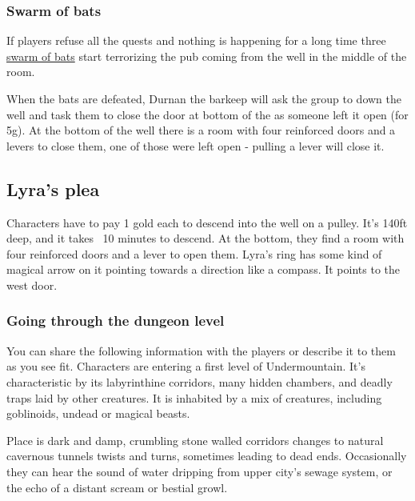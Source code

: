 \documentclass[10pt,onecolumn,twoside,openany,bg=full,layout=true]{dndbook}
\begin{document}
\subsubsection{Swarm of bats}
If players refuse all the quests and nothing is happening for a long time three
\href{https://www.dndbeyond.com/monsters/17028-swarm-of-bats}{swarm of bats} start terrorizing the pub coming from the well in the middle of the room.

When the bats are defeated, Durnan the barkeep will ask the group to down the well and task them to close the door at bottom of the as someone left it open (for 5g).
At the bottom of the well there is a room with four reinforced doors and a levers to close them, one of those were left open - pulling a lever will close it.
\vfill
\newpage

\subsection{Lyra's plea}\label{subsec:lyras-plea}
Characters have to pay 1 gold each to descend into the well on a pulley.
It's 140ft deep, and it takes ~10 minutes to descend.
At the bottom, they find a room with four reinforced doors and a lever to open them.
Lyra's ring has some kind of magical arrow on it pointing towards a direction like a compass.
It points to the west door.
\subsubsection{Going through the dungeon level}
You can share the following information with the players or describe it to them as you see fit.
Characters are entering a first level of Undermountain.
It's characteristic by its labyrinthine corridors, many hidden chambers, and deadly traps laid by other creatures.
It is inhabited by a mix of creatures, including goblinoids, undead or magical beasts.
\begin{DndReadAloud}
Place is dark and damp, crumbling stone walled corridors changes to natural cavernous tunnels twists and turns, sometimes leading to dead ends.
Occasionally they can hear the sound of water dripping from upper city's sewage system, or the echo of a distant scream or bestial growl.
\end{DndReadAloud}
\end{document}
